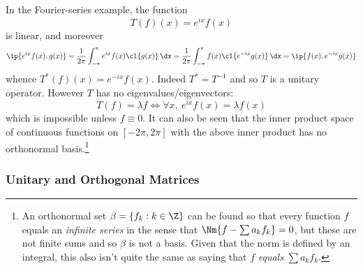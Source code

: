 \begin{example}{}{}
In the Fourier-series example, the function
\[T(f)(x)=e^{ix}f(x)\]
is linear, and moreover
\[\ip{e^{ix}f(x),g(x)}=\frac 1{2\pi}\int_{-\pi}^\pi e^{ix}f(x)\cl{g(x)}\,\dx =\frac 1{2\pi}\int_{-\pi}^\pi f(x)\cl{e^{-ix}g(x)}\,\dx =\ip{f(x),e^{-ix}g(x)}\]
whence $T^*(f)(x)=e^{-ix}f(x)$. Indeed $T^*=T^{-1}$ and so $T$ is a unitary operator. However $T$ has no eigenvalues/eigenvectors:
\[T(f)=\lambda f\iff \forall x,\ e^{ix}f(x)=\lambda f(x)\]
which is impossible unless $f\equiv 0$. It can also be seen that the inner product space of continuous functions on $[-2\pi,2\pi]$ with the above inner product has no orthonormal basis.\footnote{An orthonormal set $\beta=\{f_k:k\in\Z\}$ can be found so that every function $f$ equals an \emph{infinite series} in the sense that $\Nm{f-\sum a_kf_k}=0$, but these are not finite sums and so $\beta$ is not a basis. Given that the norm is defined by an integral, this also isn't quite the same as saying that $f$ \emph{equals} $\sum a_kf_k$.}
\end{example}

\subsubsection*{Unitary and Orthogonal Matrices}

